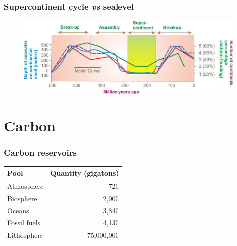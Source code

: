 \documentclass{beamer}
\begin{document}
        \begin{frame}
        \frametitle{Supercontinent cycle \textit{vs} sealevel}
        \begin{figure}
        \begin{center}
                \includegraphics[width=\textwidth]{sealevel.png}
        \end{center}
        \end{figure}
        \end{frame}

        \section{Carbon}
        \begin{frame}
        \frametitle{Carbon reservoirs}
        \begin{center}
        \begin{tabular}{l | r}
                Pool    &       Quantity (gigatons) \\\hline\hline
                Atmosphere      &       720 \\
                Biosphere       &       2,000 \\
                Oceans          &       3,840 \\
                Fossil fuels    &       4,130 \\
                \alert{Lithosphere}     &       \alert{75,000,000}
        \end{tabular}
        \end{center}
        \end{frame}
        
\end{document}

